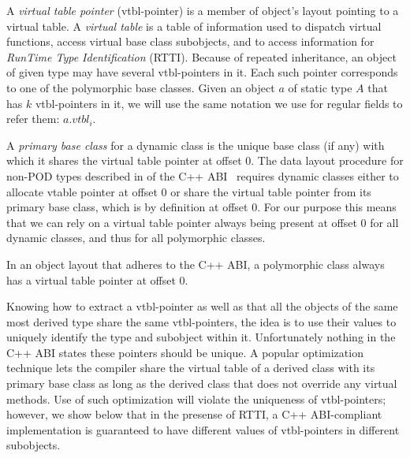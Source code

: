 A \emph{virtual table pointer} (vtbl-pointer) is a member of object's layout 
pointing to a virtual table. A \emph{virtual table} is a table of information used 
to dispatch virtual functions, access virtual base class subobjects, and to 
access information for \emph{RunTime Type Identification} (RTTI). Because of repeated
inheritance, an object of given type may have several vtbl-pointers in it. Each 
such pointer corresponds to one of the polymorphic base classes. Given an object 
$a$ of static type $A$ that has $k$ vtbl-pointers in it, we will use the same 
notation we use for regular fields to refer them: $a.\textit{vtbl}_i$.

A \emph{primary base class} for a dynamic class is the unique base class (if any) 
with which it shares the virtual table pointer at offset 0. The data layout 
procedure for non-POD types described in  of the C++ ABI~\cite{C++ABI} 
requires dynamic classes either to allocate vtable pointer at offset 0 or share 
the virtual table pointer from its primary base class, which is by definition at 
offset 0. For our purpose this means that we can rely on a virtual table pointer 
always being present at offset 0 for all dynamic classes, and thus for all polymorphic 
classes.

\begin{lemma}
In an object layout that adheres to the C++ ABI, a polymorphic class always has a 
virtual table pointer at offset 0.
\label{lem:vtbl}
\end{lemma}

\noindent
Knowing how to extract a vtbl-pointer as well as that all the objects of the 
same most derived type share the same vtbl-pointers, the idea is to use their 
values to uniquely identify the type and subobject within it. Unfortunately 
nothing in the C++ ABI states these pointers should be unique. A popular 
optimization technique lets the compiler share the virtual table of a derived 
class with its primary base class as long as the derived class that does not 
override any virtual methods. Use of such optimization will violate the 
uniqueness of vtbl-pointers; however, we show below that in the presense of 
RTTI, a C++ ABI-compliant implementation is guaranteed to have different values 
of vtbl-pointers in different subobjects.


